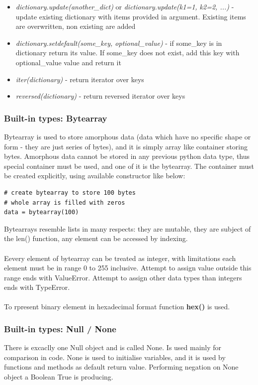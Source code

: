\documentclass{article}
\begin{document}
\begin{itemize}
\item \textit{dictionary.update(another\_dict)} or \textit{dictionary.update(k1=1, k2=2, ...)} - update existing dictionary with items provided in argument. Existing items are overwritten, non existing are added
\item \textit{dictionary.setdefault(some\_key, optional\_value)} - if some\_key is in dictionary return its value. If some\_key does not exist, add this key with optional\_value value and return it
\item \textit{iter(dictionary)} - return iterator over keys
\item \textit{reversed(dictionary)} - return reversed iterator over keys
\end{itemize}

	\subsubsection{Built-in types: Bytearray}
	Bytearray is used to store amorphous data (data which have no specific shape or form - they are just series of bytes), and it is simply array like container storing bytes. Amorphous data cannot be stored in any previous python data type, thus special container must be used, and one of it is the bytearray. The container must be created explicitly, using available constructor like below:
\begin{lstlisting}[style=pystyle]
# create bytearray to store 100 bytes
# whole array is filled with zeros
data = bytearray(100)
\end{lstlisting}
Bytearrays resemble lists in many respects: they are mutable, they are subject of the len() function, any element can be accessed by indexing. 
\paragraph{}
Eevery element of bytearray can be treated as integer, with limitations each element must be in range 0 to 255 inclusive. Attempt to assign value outside this range ends with \textcolor{pythonerror}{ValueError}. Attempt to assign other data types than integers ends with \textcolor{pythonerror}{TypeError}. 
\paragraph{}
To rpresent binary element in hexadecimal format function \textbf{hex()} is used.

	\subsubsection{Built-in types: Null / None}
	There is excaclly one Null object and is called None. Is used mainly for comparison in code. None is used to initialise variables, and it is used by functions and methods as default return value. Performing negation on None object a Boolean True is producing.
	
\end{document}
